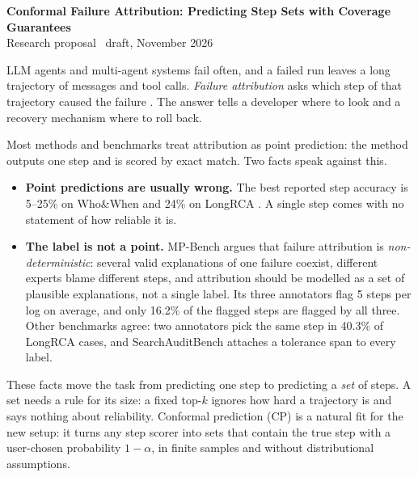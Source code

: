 \documentclass[10pt,a4paper]{article}
\makeatletter
\renewcommand\section{\@startsection{section}{1}{\z@}{6pt plus 2pt minus 1pt}{2pt}{\normalsize\bfseries}}
\makeatother
\begin{document}
\begin{center}
{\large\bfseries Conformal Failure Attribution: Predicting Step Sets with Coverage Guarantees}\\[1pt]
{\small Research proposal \textperiodcentered\ draft, November 2026}
\end{center}
\vspace{-4pt}

\section{Introduction}

LLM agents and multi-agent systems fail often, and a failed run leaves a long trajectory of messages and tool calls. \emph{Failure attribution} asks which step of that trajectory caused the failure \cite{zhang2025who}. The answer tells a developer where to look and a recovery mechanism where to roll back.

Most methods and benchmarks treat attribution as point prediction: the method outputs one step and is scored by exact match. Two facts speak against this.
\begin{itemize}
\item \textbf{Point predictions are usually wrong.} The best reported step accuracy is 5--25\% on Who\&When \cite{zhang2025who} and 24\% on LongRCA \cite{longrca2026}. A single step comes with no statement of how reliable it is.
\item \textbf{The label is not a point.} MP-Bench \cite{mpbench2026} argues that failure attribution is \emph{non-deterministic}: several valid explanations of one failure coexist, different experts blame different steps, and attribution should be modelled as a set of plausible explanations, not a single label. Its three annotators flag 5 steps per log on average, and only 16.2\% of the flagged steps are flagged by all three. Other benchmarks agree: two annotators pick the same step in 40.3\% of LongRCA cases, and SearchAuditBench \cite{searchauditor2026} attaches a tolerance span to every label.
\end{itemize}

These facts move the task from predicting one step to predicting a \emph{set} of steps. A set needs a rule for its size: a fixed top-$k$ ignores how hard a trajectory is and says nothing about reliability. Conformal prediction (CP) \cite{angelopoulos2021gentle} is a natural fit for the new setup: it turns any step scorer into sets that contain the true step with a user-chosen probability $1-\alpha$, in finite samples and without distributional assumptions.
\end{document}
